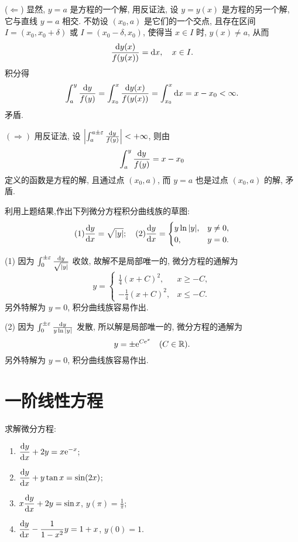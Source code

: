 \begin{solve}
  ($\Leftarrow$) 显然, $y=a$ 是方程的一个解, 用反证法, 设 $y=y(x)$ 是方程的另一个解, 
  它与直线 $y=a$ 相交. 不妨设 $(x_0,a)$ 是它们的一个交点, 
  且存在区间 $I=(x_0,x_0+\delta)$ 或 $I=(x_0-\delta,x_0)$, 
  使得当 $x\in I$ 时, $y(x)\neq a$, 从而
  \[\frac{\mathop{}\!\mathrm{d} y(x)}{f(y(x))}=\mathop{}\!\mathrm{d} x,\quad x\in I.\]
  积分得
  \[\int_a^y\frac{\mathop{}\!\mathrm{d} y}{f(y)}=\int_{x_0}^x\frac{\mathop{}\!\mathrm{d} y(x)}{f(y(x))}
    = \int_{x_0}^x\mathop{}\!\mathrm{d} x = x-x_0<\infty.\]
  矛盾.

  $(\Rightarrow)$ 用反证法, 设 $\left|\int_a^{a\pm\varepsilon}\frac{\mathop{}\!\mathrm{d} y}{f(y)}\right|<+\infty$,
  则由
  \[\int_a^y\frac{\mathop{}\!\mathrm{d} y}{f(y)}=x-x_0\]
  定义的函数是方程的解, 且通过点 $(x_0,a)$, 而 $y=a$ 也是过点 $(x_0,a)$ 的解, 矛盾.
\end{solve}



\begin{exercise}
  利用上题结果,作出下列微分方程积分曲线族的草图:
  \[(1)\frac{\mathop{}\!\mathrm{d} y}{\mathop{}\!\mathrm{d} x}=\sqrt{|y|};\quad
  (2)\frac{\mathop{}\!\mathrm{d} y}{\mathop{}\!\mathrm{d} x}=
  \begin{cases}
    y\ln|y|, & y\neq 0, \\
    0,       & y=0.
  \end{cases}\]
\end{exercise}

\begin{solve}
(1) 因为 $\int_0^{\pm\varepsilon}\frac{\mathop{}\!\mathrm{d} y}{\sqrt{|y|}}$ 收敛, 故解不是局部唯一的, 微分方程的通解为
\[y=
  \begin{cases}
    \frac{1}{4}(x+C)^2,  & x\geq -C, \\
    -\frac{1}{4}(x+C)^2, & x\leq -C.
  \end{cases}\]
另外特解为 $y=0$, 积分曲线族容易作出.

(2) 因为 $\int_0^{\pm\varepsilon}\frac{\mathop{}\!\mathrm{d} y}{y\ln|y|}$ 发散, 所以解是局部唯一的, 微分方程的通解为
\[y=\pm\mathrm{e}^{C\mathrm{e}^x}\quad(C\in\mathbb{R}).\]
另外特解为 $y=0$, 积分曲线族容易作出.
\end{solve}



\section{一阶线性方程}



\begin{exercise}
  求解微分方程:
  \begin{enumerate}[(1)]
  \item $\displaystyle\frac{\mathop{}\!\mathrm{d} y}{\mathop{}\!\mathrm{d} x}+2y=x\mathrm{e}^{-x}$;
  \item $\displaystyle\frac{\mathop{}\!\mathrm{d} y}{\mathop{}\!\mathrm{d} x}+y\tan x=\sin(2x)$;
  \item $\displaystyle x\frac{\mathop{}\!\mathrm{d} y}{\mathop{}\!\mathrm{d} x}+2y=\sin x$, $y(\pi)=\frac{1}{\pi}$;
  \item $\displaystyle\frac{\mathop{}\!\mathrm{d} y}{\mathop{}\!\mathrm{d} x}-\frac{1}{1-x^2}y=1+x$, $y(0)=1$.
  \end{enumerate}
\end{exercise}

